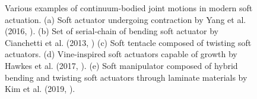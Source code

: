 \begin{figure}[!t]
  \vspace{-2mm}
  \ifx\printFigures\undefined
  \else
  \centering
  \hspace{2mm}
  \vspace{-6mm}
  \fi
  \caption{Various examples of continuum-bodied joint motions in modern soft actuation. (a) Soft actuator undergoing contraction by Yang et al. (2016, \cite{Yang2016}). (b) Set of serial-chain of bending soft actuator by Cianchetti et al. (2013, \cite{Cianchetti2013Nov,Cianchetti2014}) (c) Soft tentacle composed of twisting soft actuators. (d) Vine-inspired soft actuators capable of growth by Hawkes et al. (2017, \cite{Hawkes2017}). (e) Soft manipulator composed of hybrid bending and twisting soft actuators through laminate materials by Kim et al. (2019, \cite{Kim2019Aug}).}
  \vspace{-6mm}
  \label{fig:C0:actuationtypes}
\end{figure}

